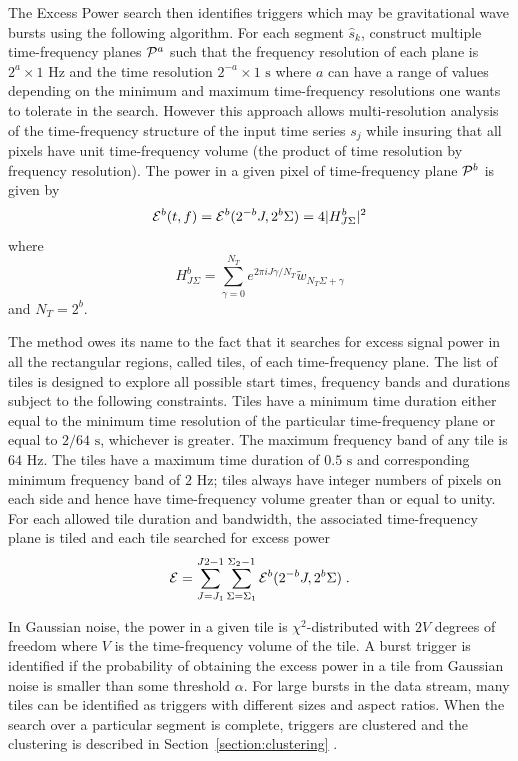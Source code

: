 The Excess Power search then identifies triggers which may be
gravitational wave bursts using the following algorithm.  For each
segment $\hat{s}_k$,  construct multiple time-frequency planes
${\cal{P}}^a$ such that the frequency resolution of each plane is
$2^a \times 1 \textrm{ Hz}$ and the time resolution $2^{-a} \times 1
\textrm{ s}$ where $a$ can have a range of values depending on the 
minimum and maximum time-frequency resolutions one wants to tolerate 
in the search.  However this approach allows
multi-resolution analysis of the time-frequency structure of the input
time series $s_j$ while insuring that all pixels have unit
time-frequency volume (the product of time resolution by frequency
resolution).   The power in a given pixel of time-frequency plane
${\cal{P}}^b$ is given by
\begin{equation}
{\cal E}^b(t,f) = {\cal E}^b( 2^{-b} J, 2^b \Sigma ) = 4 | H^b_{J\Sigma} |^2
\end{equation}
where 
\begin{equation}
H^b_{J\Sigma} = \sum_{\gamma=0}^{N_T} e^{ 2 \pi i J \gamma / N_T }
\tilde{w}_{N_T \Sigma + \gamma}
\end{equation}
and $N_T = 2^b$.

The method owes its name to the fact that it searches for excess
signal power in all the rectangular regions, called tiles, of each
time-frequency plane.  The list of tiles is designed to explore all
possible start times, frequency bands and durations subject to the
following constraints.  Tiles have a minimum time duration either
equal to the minimum time resolution of the particular time-frequency
plane or equal to $2/64 \textrm{ s}$,  whichever is greater.  The
maximum frequency band of any tile is $64 \textrm{ Hz}$.  The tiles
have a maximum time duration of $0.5 \textrm{ s}$ and corresponding
minimum frequency band of $2 \textrm{ Hz}$;  tiles always have integer
numbers of pixels on each side and hence have time-frequency volume
greater than or equal to unity.  For each allowed tile duration and
bandwidth,  the associated time-frequency plane is tiled and each tile
searched for excess power
\begin{equation}
{\cal{E}} = \sum_{J=J_1}^{J2-1} \sum_{\Sigma=\Sigma_1}^{\Sigma_2-1}
{\cal E}^b( 2^{-b} J , 2^b \Sigma ) \;.
\end{equation}

In Gaussian noise,  the power in a given tile is $\chi^2$-distributed
with $2 V$ degrees of freedom where $V$ is the time-frequency volume
of the tile.    A burst trigger is identified if the probability of
obtaining the excess power in a tile from Gaussian noise is smaller
than some threshold $\alpha$.   For large bursts in the data stream,
many tiles can be identified as triggers with different sizes and
aspect ratios.   When the search over a particular segment is
complete,   triggers are clustered and the clustering is described in 
Section~\ref{section:clustering} .

